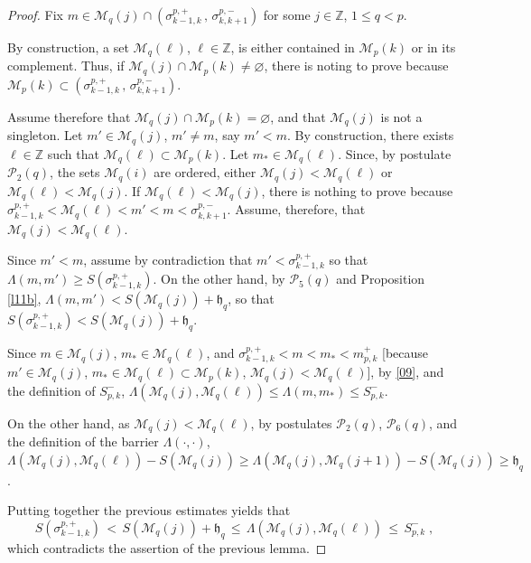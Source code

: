 \documentclass[reqno]{amsart}
\theoremstyle{plain}
\theoremstyle{definition}
\newcommand{\mc}[1]{{\mathcal #1}}
\newcommand{\mf}[1]{{\mathfrak #1}}
\newcommand{\bb}[1]{{\mathbb #1}}
\newcommand{\ms}[1]{{\mathscr #1}}
\newcounter{as}[section]
\newcommand{\<}{\langle}
\renewcommand{\>}{\rangle}
\begin{document}
\begin{proof}
Fix $m\in \ms M_{q}(j) \cap (\sigma^{p,+}_{k-1,k} \,,\,
\sigma^{p,-}_{k,k+1})$ for some $j\in \bb Z$, $1\le q<p$.

By construction, a set $\ms M_{q}(\ell)$, $\ell\in \bb Z$, is either
contained in $\ms M_{p}(k)$ or in its complement. Thus, if
$\ms M_{q}(j) \cap \ms M_{p}(k) \neq \varnothing$, there is noting to
prove because
$\ms M_{p}(k) \subset (\sigma^{p,+}_{k-1,k} \,,\,
\sigma^{p,-}_{k,k+1})$.

Assume therefore that $\ms M_{q}(j) \cap \ms M_{p}(k) = \varnothing$,
and that $\ms M_{q}(j)$ is not a singleton.  Let $m'\in \ms M_{q}(j)$,
$m'\neq m$, say $m'<m$. By construction, there exists $\ell\in \bb Z$
such that $\ms M_{q}(\ell) \subset \ms M_{p}(k)$. Let
$m_*\in \ms M_{q}(\ell)$.  Since, by postulate $\mc P_2(q)$, the sets
$\ms M_{q}(i)$ are ordered, either $\ms M_{q}(j) < \ms M_{q}(\ell)$ or
$\ms M_{q}(\ell) < \ms M_{q}(j)$.  If
$\ms M_{q}(\ell) < \ms M_{q}(j)$, there is nothing to prove because
$\sigma^{p,+}_{k-1,k} < \ms M_{q}(\ell) < m' <m<
\sigma^{p,-}_{k,k+1}$.  Assume, therefore, that
$\ms M_{q}(j) < \ms M_{q}(\ell)$.

Since $m'<m$, assume by contradiction that $m'<\sigma^{p,+}_{k-1,k}$ so
that $\Lambda (m,m') \ge S(\sigma^{p,+}_{k-1,k})$. On the other hand, by
$\mc P_5(q)$ and Proposition \ref{l11b},
$\Lambda (m,m') < S(\ms M_{q}(j)) + \mf h_q$, so that
$S(\sigma^{p,+}_{k-1,k}) < S(\ms M_{q}(j)) + \mf h_q$.

Since $m\in \ms M_{q}(j)$, $m_*\in \ms M_{q}(\ell)$, and
$\sigma^{p,+}_{k-1,k} <m<m_* < m^+_{p,k}$ [because
$m'\in \ms M_{q}(j)$, $m_*\in \ms M_{q}(\ell) \subset \ms M_{p}(k) $,
$\ms M_{q}(j) < \ms M_{q}(\ell) $], by \eqref{09}, and the definition
of $S^-_{p,k}$,
$\Lambda(\ms M_{q}(j) , \ms M_{q}(\ell)) \le \Lambda (m,m_*) \le
S^-_{p,k}$.

On the other hand, as $\ms M_{q}(j) < \ms M_{q}(\ell)$, by postulates
$\mc P_2(q)$, $\mc P_6(q)$, and the definition of the barrier
$\Lambda (\cdot, \cdot)$,
$\Lambda(\ms M_{q}(j) , \ms M_{q}(\ell)) - S(\ms M_{q}(j)) \ge
\Lambda(\ms M_{q}(j) , \ms M_{q}(j+1)) - S(\ms M_{q}(j)) \ge \mf h_q$.

Putting together the previous estimates yields that
\begin{equation*}
S(\sigma^{p,+}_{k-1,k}) \,<\, S(\ms M_{q}(j)) + \mf
h_q \,\le\, \Lambda(\ms M_{q}(j) , \ms M_{q}(\ell))
\,\le\, S^-_{p,k}\;,
\end{equation*}
which contradicts the assertion of the previous lemma.
\end{proof}
\end{document}
